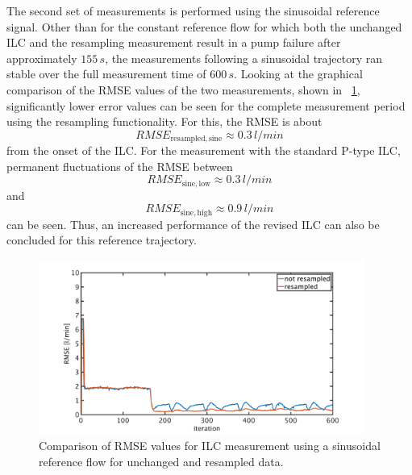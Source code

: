 The second set of measurements is performed using the sinusoidal reference signal. Other than for the constant reference flow for which both the unchanged ILC and the resampling measurement result in a pump failure after approximately $155\,s$, the measurements following a sinusoidal trajectory ran stable over the full measurement time of $600\,s$.
Looking at the graphical comparison of the RMSE values of the two measurements, shown in \figurename~\ref{fig:RMSE_ilc_var_dist_comp_sine}, significantly lower error values can be seen for the complete measurement period using the resampling functionality. For this, the RMSE is about
\begin{equation}
RMSE_{\mathrm{resampled,sine}}\approx0.3\,l/min
\end{equation}
from the onset of the ILC. For the measurement with the standard P-type ILC, permanent fluctuations of the RMSE between
\begin{equation}
 RMSE_{\mathrm{sine,low}}\approx0.3\,l/min
\end{equation}
and
\begin{equation}
 RMSE_{\mathrm{sine,high}}\approx0.9\,l/min
\end{equation}
can be seen.
Thus, an increased performance of the revised ILC can also be concluded for this reference trajectory.
\begin{figure}[ht!]
  \centering
  \includegraphics[width=0.95\textwidth]{images/chapt_5/ILC/RMSE_ilc_var_dist_comp_sine.pdf}
  \caption[Comparison of RMSE values for ILC measurement using a sinusoidal reference flow for unchanged and resampled data]{Comparison of RMSE values for ILC measurement using a sinusoidal reference flow for unchanged and resampled data.}
  \label{fig:RMSE_ilc_var_dist_comp_sine}
\end{figure}

